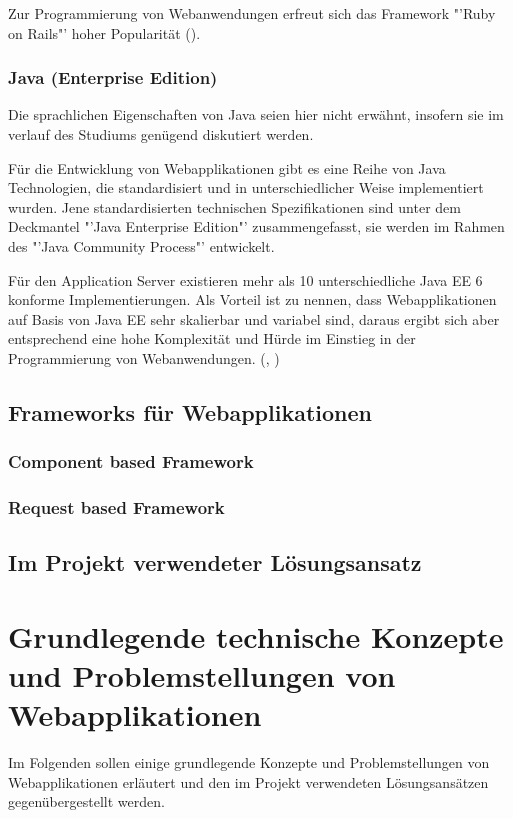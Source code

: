 \documentclass[12pt]{report}
\begin{document}
Zur Programmierung von Webanwendungen erfreut sich das Framework "'Ruby on Rails"' hoher Popularität (\cite{RubyOnRails}).

\subsection{Java (Enterprise Edition)}
Die sprachlichen Eigenschaften von Java seien hier nicht erwähnt, insofern sie im verlauf des Studiums genügend diskutiert werden.

Für die Entwicklung von Webapplikationen gibt es eine Reihe von Java Technologien, die standardisiert und in unterschiedlicher Weise implementiert wurden. Jene standardisierten technischen Spezifikationen sind unter dem Deckmantel "'Java Enterprise Edition"' \cite{JavaEE} zusammengefasst, sie werden im Rahmen des "'Java Community Process"' \cite{JavaCommunityProcess} entwickelt.

Für den Application Server existieren mehr als 10 unterschiedliche Java EE 6 konforme Implementierungen. Als Vorteil ist zu nennen, dass Webapplikationen auf Basis von Java EE sehr skalierbar und variabel sind, daraus ergibt sich aber entsprechend eine hohe Komplexität und Hürde im Einstieg in der Programmierung von Webanwendungen. (\cite{eberling2007enterprise}, \cite{mueller2010javaserver})
\section{Frameworks für Webapplikationen}
\label{sec:Frameworks}
\subsection{Component based Framework}
\subsection{Request based Framework}
\section{Im Projekt verwendeter Lösungsansatz}


\chapter{Grundlegende technische Konzepte und Problemstellungen von Webapplikationen}

Im Folgenden sollen einige grundlegende Konzepte und Problemstellungen von Webapplikationen erläutert und den im Projekt verwendeten Lösungsansätzen gegenübergestellt werden. 
\end{document}
